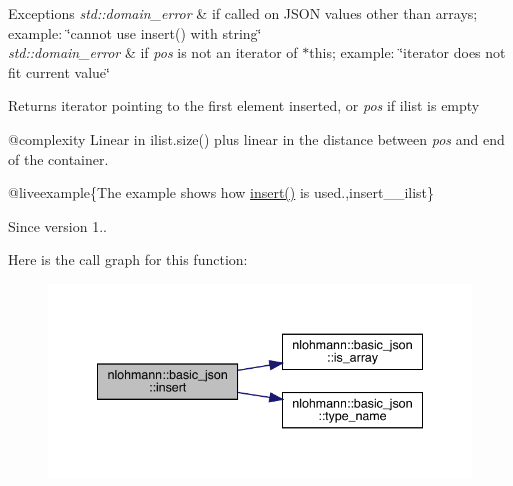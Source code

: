 \begin{DoxyExceptions}{Exceptions}
{\em std\+::domain\+\_\+error} & if called on J\+S\+ON values other than arrays; example\+: {\ttfamily \char`\"{}cannot use insert() with string\char`\"{}} \\
\hline
{\em std\+::domain\+\_\+error} & if {\itshape pos} is not an iterator of $\ast$this; example\+: {\ttfamily \char`\"{}iterator does not fit current value\char`\"{}}\\
\hline
\end{DoxyExceptions}
\begin{DoxyReturn}{Returns}
iterator pointing to the first element inserted, or {\itshape pos} if {\ttfamily ilist} is empty
\end{DoxyReturn}
@complexity Linear in {\ttfamily ilist.\+size()} plus linear in the distance between {\itshape pos} and end of the container.

@liveexample\{The example shows how {\ttfamily \mbox{\hyperlink{classnlohmann_1_1basic__json_a0136728f5db69d4051c77b94307abd6c}{insert()}}} is used.,insert\+\_\+\+\_\+ilist\}

\begin{DoxySince}{Since}
version 1.. 
\end{DoxySince}
Here is the call graph for this function\+:
\nopagebreak
\begin{figure}[H]
\begin{center}
\leavevmode
\includegraphics[width=341pt]{classnlohmann_1_1basic__json_ad154c4228e4867c67b25a6601ced89bd_cgraph}
\end{center}
\end{figure}
\mbox{\label{classnlohmann_1_1basic__json_aef9ce5dd2381caee1f8ddcdb5bdd9c65}} 
